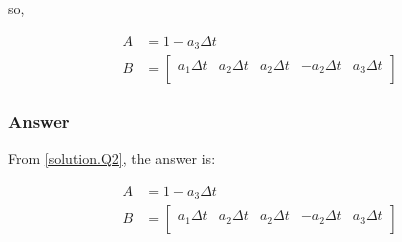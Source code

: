 \documentclass[titlepage,a4paper]{article}
\begin{document}
        so,

        \begin{equation}
            \begin{aligned}
                A &=1-a_3 \Delta t \\
                B &=
                \begin{bmatrix}
                    a_1 \Delta t & a_2 \Delta t & a_2 \Delta t & -a_2 \Delta t & a_3 \Delta t \\
                \end{bmatrix}
            \end{aligned}
        \end{equation}
        

        \subsubsection{Answer}

        From \ref{solution.Q2}, the answer is:
        
        \begin{equation}
            \begin{aligned}
                A &=1-a_3 \Delta t \\
                B &=
                \begin{bmatrix}
                    a_1 \Delta t & a_2 \Delta t & a_2 \Delta t & -a_2 \Delta t & a_3 \Delta t \\
                \end{bmatrix}
            \end{aligned}
        \end{equation}


\ifx \allfiles \undefined    
\end{document}
